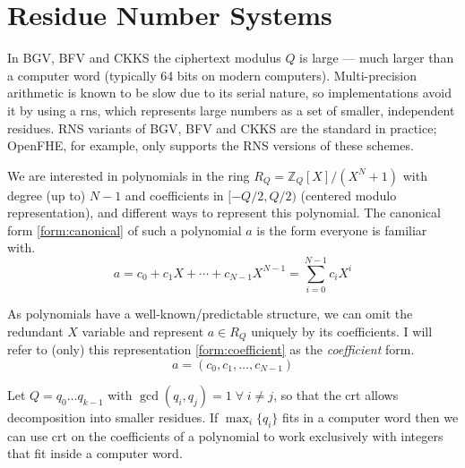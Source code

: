 \section{Residue Number Systems}
\label{sec:rns}
In BGV, BFV and CKKS the ciphertext modulus $Q$ is large --- much larger than a computer word (typically 64 bits on modern computers). Multi-precision arithmetic is known to be slow due to its serial nature, so implementations avoid it by using a \gls{rns}, which represents large numbers as a set of smaller, independent residues. RNS variants of BGV, BFV and CKKS are the standard in practice; OpenFHE, for example, only supports the RNS versions of these schemes.

\begin{definition}
    We are interested in polynomials in the ring $R_Q = \mathbb{Z}_Q[X]/(X^N+1)$ with degree (up to) $N - 1$ and coefficients in $[-Q/2, Q/2)$ (centered modulo representation), and different ways to represent this polynomial. The canonical form \eqref{form:canonical} of such a polynomial $a$ is the form everyone is familiar with.
    \begin{equation}
        \label{form:canonical}
        a = c_0 + c_1X + \cdots + c_{N-1}X^{N-1} = \sum_{i=0}^{N-1} c_iX^i
    \end{equation}
\end{definition}

\begin{definition}
    As polynomials have a well-known/predictable structure, we can omit the redundant $X$ variable and represent $a\in R_Q$ uniquely by its coefficients. I will refer to (only) this representation \eqref{form:coefficient} as the \emph{coefficient} form.  
    \begin{equation}
        \label{form:coefficient}
        a = (c_0, c_1, \dots, c_{N-1})
    \end{equation}
\end{definition}

Let $Q = q_0\dots q_{k-1}$ with $\gcd(q_i, q_j) = 1 \;\forall\; i\not= j$, so that the \gls{crt} allows decomposition into smaller residues. If $\max_i\{q_i\}$ fits in a computer word then we can use \gls{crt} on the coefficients of a polynomial to work exclusively with integers that fit inside a computer word.

